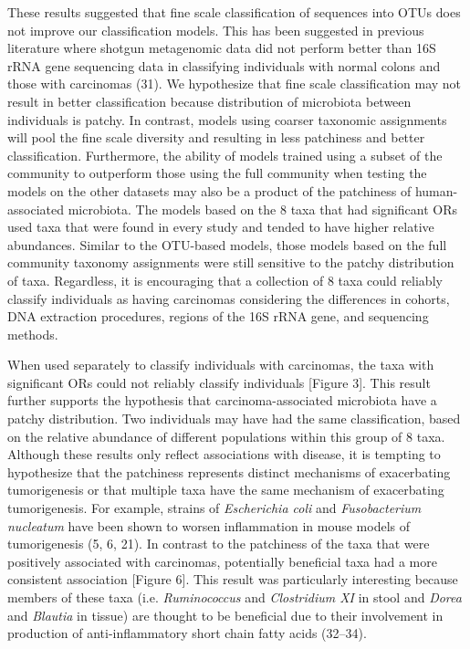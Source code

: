 \documentclass[12pt,]{article}
\begin{document}
These results suggested that fine scale classification of sequences into
OTUs does not improve our classification models. This has been suggested
in previous literature where shotgun metagenomic data did not perform
better than 16S rRNA gene sequencing data in classifying individuals
with normal colons and those with carcinomas (31). We hypothesize that
fine scale classification may not result in better classification
because distribution of microbiota between individuals is patchy. In
contrast, models using coarser taxonomic assignments will pool the fine
scale diversity and resulting in less patchiness and better
classification. Furthermore, the ability of models trained using a
subset of the community to outperform those using the full community
when testing the models on the other datasets may also be a product of
the patchiness of human-associated microbiota. The models based on the 8
taxa that had significant ORs used taxa that were found in every study
and tended to have higher relative abundances. Similar to the OTU-based
models, those models based on the full community taxonomy assignments
were still sensitive to the patchy distribution of taxa. Regardless, it
is encouraging that a collection of 8 taxa could reliably classify
individuals as having carcinomas considering the differences in cohorts,
DNA extraction procedures, regions of the 16S rRNA gene, and sequencing
methods.

When used separately to classify individuals with carcinomas, the taxa
with significant ORs could not reliably classify individuals {[}Figure
3{]}. This result further supports the hypothesis that
carcinoma-associated microbiota have a patchy distribution. Two
individuals may have had the same classification, based on the relative
abundance of different populations within this group of 8 taxa. Although
these results only reflect associations with disease, it is tempting to
hypothesize that the patchiness represents distinct mechanisms of
exacerbating tumorigenesis or that multiple taxa have the same mechanism
of exacerbating tumorigenesis. For example, strains of \emph{Escherichia
coli} and \emph{Fusobacterium nucleatum} have been shown to worsen
inflammation in mouse models of tumorigenesis (5, 6, 21). In contrast to
the patchiness of the taxa that were positively associated with
carcinomas, potentially beneficial taxa had a more consistent
association {[}Figure 6{]}. This result was particularly interesting
because members of these taxa (i.e. \emph{Ruminococcus} and
\emph{Clostridium XI} in stool and \emph{Dorea} and \emph{Blautia} in
tissue) are thought to be beneficial due to their involvement in
production of anti-inflammatory short chain fatty acids (32--34).
\end{document}
